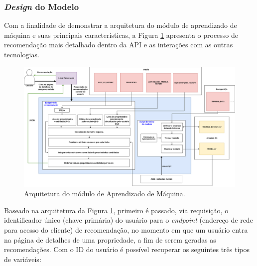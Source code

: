 \subsubsection{\textit{Design} do Modelo}
\label{design_modelo}

Com a finalidade de demonstrar a arquitetura do módulo de aprendizado de máquina e suas principais características, a Figura \ref{fig:sr_nivel3} apresenta o processo de recomendação mais detalhado dentro da API e as interações com as outras tecnologias.

\begin{figure}
    \centering
    \includegraphics[scale=0.4]{figuras/proposta/sr_nivel3.png}
    \caption[Arquitetura do módulo de Aprendizado de Máquina]{Arquitetura do módulo de Aprendizado de Máquina.}
    \label{fig:sr_nivel3}
\end{figure}

Baseado na arquitetura da Figura \ref{fig:sr_nivel3}, primeiro é passado, via requisição, o identificador único (chave primária) do usuário para o \textit{endpoint} (endereço de rede para acesso do cliente) de recomendação, no momento em que um usuário entra na página de detalhes de uma propriedade, a fim de serem geradas as recomendações. Com o ID do usuário é possível recuperar os seguintes três tipos de variáveis:


